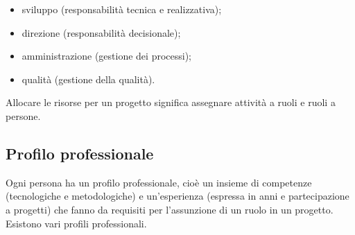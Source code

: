 \documentclass[a4paper]{article}
\begin{document}
	\begin{itemize}
		
			
	\item sviluppo (responsabilità tecnica e realizzativa);
			
	\item direzione (responsabilità decisionale);
			
	\item amministrazione (gestione dei processi);
			
	\item qualità (gestione della qualità).
		
	\end{itemize}

		
Allocare le risorse per un progetto significa assegnare attività a ruoli e ruoli a persone.

		
	\subsection{Profilo professionale}

		
Ogni persona ha un profilo professionale, cioè un insieme di competenze (tecnologiche e metodologiche) e un'esperienza (espressa in anni e partecipazione a progetti) che fanno da requisiti per l'assunzione di un ruolo in un progetto. Esistono vari profili professionali.
		
\end{document}
